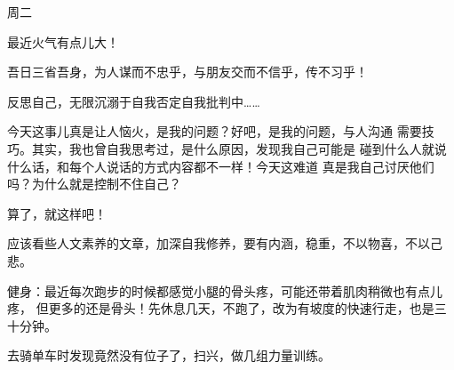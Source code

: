 

周二

最近火气有点儿大！

吾日三省吾身，为人谋而不忠乎，与朋友交而不信乎，传不习乎！

反思自己，无限沉溺于自我否定自我批判中……

今天这事儿真是让人恼火，是我的问题？好吧，是我的问题，与人沟通
需要技巧。其实，我也曾自我思考过，是什么原因，发现我自己可能是
碰到什么人就说什么话，和每个人说话的方式内容都不一样！今天这难道
真是我自己讨厌他们吗？为什么就是控制不住自己？

算了，就这样吧！

应该看些人文素养的文章，加深自我修养，要有内涵，稳重，不以物喜，不以己悲。

健身：最近每次跑步的时候都感觉小腿的骨头疼，可能还带着肌肉稍微也有点儿疼，
但更多的还是骨头！先休息几天，不跑了，改为有坡度的快速行走，也是三十分钟。

去骑单车时发现竟然没有位子了，扫兴，做几组力量训练。
